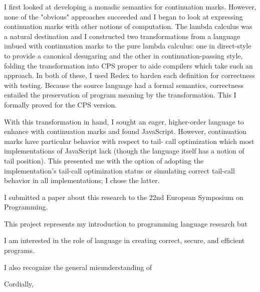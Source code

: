 \documentclass{letter}
\begin{document}
\begin{letter}
I first looked at developing a monadic semantics for continuation marks. However, none of the 
"obvious" approaches succeeded and I began to look at expressing continuation marks with other 
notions of computation. The lambda calculus was a natural destination and I constructed two 
transformations from a language imbued with continuation marks to the pure lambda calculus: one 
in direct-style to provide a canonical desugaring and the other in continuation-passing style, 
folding the transformation into CPS proper to aide compilers which take such an approach. In both 
of these, I used Redex to harden each definition for correctness with testing. Because the source language had a formal 
semantics, correctness entailed the preservation of program meaning by the transformation. This 
I formally proved for the CPS version.

With this transformation in hand, I sought an eager, higher-order language to enhance with continuation 
marks and found JavaScript. However, continuation marks have particular behavior with respect to tail-
call optimization which most implementations of JavaScript lack (though the language itself has a 
notion of tail position). This presented me with the option of adopting the implementation's tail-call 
optimization status or simulating correct tail-call behavior in all implementations; I chose the latter.

I submitted a paper about this research to the 22nd European Symposium on Programming.

This project represents my introduction to programming language research but 

I am interested in the role of language in creating correct, secure, and efficient programs.

I also recognize the general misunderstanding of 

\closing{Cordially,}
\end{letter}
\end{document}
